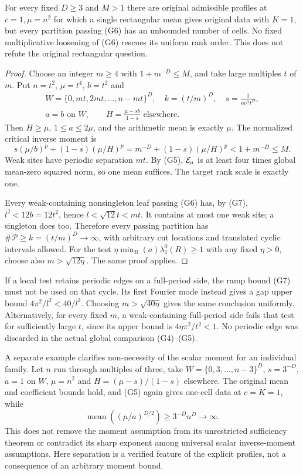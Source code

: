 \begin{proposition}\label{prop:geo-minimum}
For every fixed $D\geq3$ and $M>1$ there are original admissible profiles
at $c=1,\mu=n^2$ for which a single rectangular mean gives original data
with $K=1$, but every partition passing (G6) has an unbounded number of
cells. No fixed multiplicative loosening of (G6) rescues its uniform rank
order. This does not refute the original rectangular question.
\end{proposition}
\begin{proof}
Choose an integer $m\geq4$ with $1+m^{-D}\leq M$, and take large multiples
$t$ of $m$. Put $n=t^2$, $\mu=t^4$, $b=t^2$ and
\[
 \begin{gathered}
 W=\{0,mt,2mt,\ldots,n-mt\}^D,\quad
 k=(t/m)^D,\quad s=\frac1{m^Dt^D},\\
 a=b\text{ on }W,\qquad H=\frac{\mu-sb}{1-s}\text{ elsewhere}.
 \end{gathered}
\]
Then $H\geq\mu$, $1\leq a\leq2\mu$, and the arithmetic mean is exactly
$\mu$. The normalized critical inverse moment is
\[
 s(\mu/b)^p+(1-s)(\mu/H)^p
      =m^{-D}+(1-s)(\mu/H)^p<1+m^{-D}\leq M.
\]
Weak sites have periodic separation $mt$. By (G5), $\mathcal E_a$ is at least
four times global mean-zero squared norm, so one mean suffices. The target
rank scale is exactly one.

Every weak-containing nonsingleton leaf passing (G6) has, by (G7),
$l^2<12b=12t^2$, hence $l<\sqrt{12}t<mt$. It contains at most one weak
site; a singleton does too. Therefore every passing partition has
$\#\mathcal P\geq k=(t/m)^D\to\infty$, with arbitrary cut locations and
translated cyclic intervals allowed. For the test
$\eta\min_R(a)\lambda_1^0(R)\geq1$ with any fixed $\eta>0$, choose also
$m>\sqrt{12\eta}$. The same proof applies.
\end{proof}
If a local test retains periodic edges on a full-period side, the ramp
bound (G7) must not be used on that cycle. Its first Fourier mode instead
gives a gap upper bound $4\pi^2/l^2<40/l^2$. Choosing
$m>\sqrt{40\eta}$ gives the same conclusion uniformly. Alternatively,
for every fixed $m$, a weak-containing full-period side fails that test
for sufficiently large $t$, since its upper bound is
$4\eta\pi^2/t^2<1$. No periodic edge was discarded in the actual global
comparison (G4)--(G5).

A separate example clarifies non-necessity of the scalar moment for an
individual family. Let $n$ run through multiples of three, take
$W=\{0,3,\ldots,n-3\}^D$, $s=3^{-D}$, $a=1$ on $W$, $\mu=n^2$ and
$H=(\mu-s)/(1-s)$ elsewhere. The original mean and coefficient bounds
hold, and (G5) again gives one-cell data at $c=K=1$, while
\[
 \operatorname{mean}((\mu/a)^{D/2})\geq3^{-D}n^D\longrightarrow\infty.
\]
This does not remove the moment assumption from its unrestricted
sufficiency theorem or contradict its sharp exponent among universal
scalar inverse-moment assumptions. Here separation is a verified feature
of the explicit profiles, not a consequence of an arbitrary moment bound.

